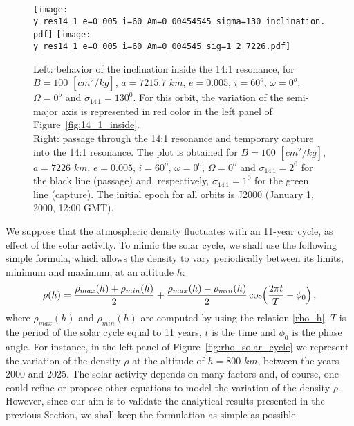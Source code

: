 \documentclass[12pt,reqno]{amsart}
\numberwithin{equation}{section}
\begin{document}
\begin{figure}[h]
\centering {} 
\texttt{[image: y\_res14\_1\_e=0\_005\_i=60\_Am=0\_00454545\_sigma=130\_inclination.pdf]}
\texttt{[image: y\_res14\_1\_e=0\_005\_i=60\_Am=0\_004545\_sig=1\_2\_7226.pdf]}
\caption{Left: behavior of the inclination inside the 14:1 resonance, for $B=100$ $[cm^2/kg]$, $a=7215.7$ $km$, $e=0.005$, $i=60^o$, $\omega=0^o$, $\Omega=0^o$ and $\sigma_{1\!4\,1}=130^0$. For this orbit, the variation of
the semi-major axis is represented in red color in the left panel of Figure~\ref{fig:14_1_inside}. \\ Right: passage through the 14:1 resonance and
temporary capture into the 14:1 resonance. The plot is obtained for  $B=100$ $[cm^2/kg]$, $a=7226$ $km$, $e=0.005$, $i=60^o$, $\omega=0^o$, $\Omega=0^o$ and $\sigma_{1\!4\,1}=2^0$ for the black line (passage) and, respectively, $\sigma_{1\!4\,1}=1^0$ for the green line (capture). The initial epoch for all orbits is J2000 (January 1, 2000, 12:00 GMT).} \label{fig:14_1_outside}
\end{figure}






We suppose that the atmospheric density fluctuates with an 11-year cycle, as effect of the solar activity. To mimic the solar cycle, we shall use the following simple formula, which allows the density to vary periodically between its limits, minimum and maximum, at an altitude $h$:
\begin{equation}\label{rho_variation_cycle}
\rho(h)=\frac{\rho_{max}(h)+\rho_{min}(h)}{2}+\frac{\rho_{max}(h)-\rho_{min}(h)}{2} \cos \Bigl(\frac{2 \pi t}{T}-\phi_0\Bigr)\,,
\end{equation}
where $\rho_{max}(h)$ and $\rho_{min}(h)$ are computed by using the relation \eqref{rho_h}, $T$ is the period of the solar cycle equal to 11 years, $t$ is the time and $\phi_0$ is the phase angle. For instance, in the left panel of Figure~\ref{fig:rho_solar_cycle} we represent the variation of the density $\rho$  at the altitude of $h=800$ $km$, between the years 2000 and 2025. The solar activity depends on many factors and, of course,  one could refine or propose other equations to
model the variation of the density $\rho$. However, since our aim is to validate the analytical results presented in the previous Section, we shall keep the formulation as simple as possible.
\end{document}
